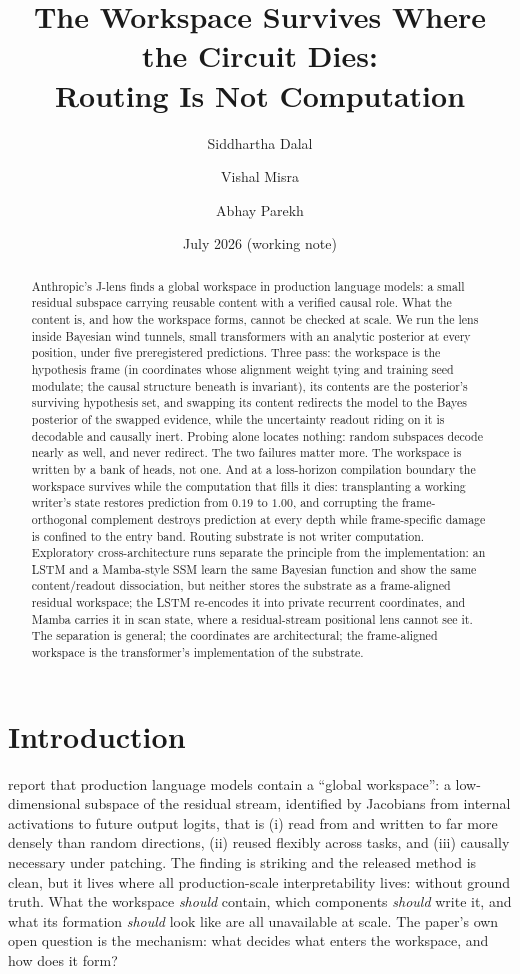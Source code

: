 \documentclass[11pt]{article}
\title{\bf The Workspace Survives Where the Circuit Dies:\\
Routing Is Not Computation}
\author{Siddhartha Dalal \and Vishal Misra \and Abhay Parekh}
\date{July 2026 (working note)}
\begin{document}
\maketitle

\begin{abstract}
Anthropic's J-lens finds a global workspace in production language
models: a small residual subspace carrying reusable content with a
verified causal role. What the content is, and how the workspace forms,
cannot be checked at scale. We run the lens inside Bayesian wind
tunnels, small transformers with an analytic posterior at every
position, under five preregistered predictions. Three pass: the
workspace is the hypothesis frame (in coordinates whose alignment
weight tying and training seed modulate; the causal structure beneath
is invariant), its contents are the posterior's
surviving hypothesis set, and swapping its content redirects the model
to the Bayes posterior of the swapped evidence, while the uncertainty
readout riding on it is decodable and causally inert. Probing alone
locates nothing: random subspaces decode nearly as well, and never
redirect. The two failures
matter more. The workspace is written by a bank of heads, not one. And
at a loss-horizon compilation boundary the workspace survives while the
computation that fills it dies: transplanting a working writer's state
restores prediction from $0.19$ to $1.00$, and corrupting the
frame-orthogonal complement destroys prediction at every depth while
frame-specific damage is confined to the entry band. Routing substrate is not writer computation. Exploratory
cross-architecture runs separate the principle from the implementation: an LSTM and
a Mamba-style SSM learn the same Bayesian function and show the same
content/readout dissociation, but neither stores the substrate as a
frame-aligned residual workspace; the LSTM re-encodes it into private
recurrent coordinates, and Mamba carries it in scan state, where a
residual-stream positional lens cannot see it. The separation is
general; the coordinates are architectural; the frame-aligned workspace
is the transformer's implementation of the substrate.
\end{abstract}

\section{Introduction}

\citet{anthropic2026workspace} report that production language models
contain a ``global workspace'': a low-dimensional subspace of the residual
stream, identified by Jacobians from internal activations to future output
logits, that is (i) read from and written to far more densely than random
directions, (ii) reused flexibly across tasks, and (iii) causally
necessary under patching. The finding is striking and the released
method is clean, but it lives where all production-scale interpretability
lives: without ground truth. What the workspace \emph{should} contain,
which components \emph{should} write it, and what its formation
\emph{should} look like are all unavailable at scale. The paper's own open
question is the mechanism: what decides what enters the workspace, and how
does it form?
\end{document}
